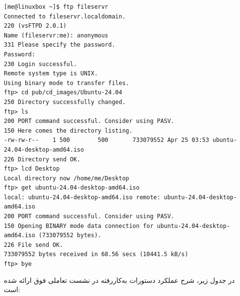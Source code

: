 \begin{latin}
\begin{lstlisting}
[me@linuxbox ~]$ ftp fileservr
Connected to fileservr.localdomain.
220 (vsFTPD 2.0.1)
Name (fileservr:me): anonymous
331 Please specify the password.
Password:
230 Login successful.
Remote system type is UNIX.
Using binary mode to transfer files.
ftp> cd pub/cd_images/Ubuntu-24.04
250 Directory successfully changed.
ftp> ls
200 PORT command successful. Consider using PASV.
150 Here comes the directory listing.
-rw-rw-r--    1 500        500       733079552 Apr 25 03:53 ubuntu-24.04-desktop-amd64.iso
226 Directory send OK.
ftp> lcd Desktop
Local directory now /home/me/Desktop
ftp> get ubuntu-24.04-desktop-amd64.iso
local: ubuntu-24.04-desktop-amd64.iso remote: ubuntu-24.04-desktop-amd64.iso
200 PORT command successful. Consider using PASV.
150 Opening BINARY mode data connection for ubuntu-24.04-desktop-amd64.iso (733079552 bytes).
226 File send OK.
733079552 bytes received in 68.56 secs (10441.5 kB/s)
ftp> bye
\end{lstlisting}
\end{latin}

در جدول زیر، شرح عملکرد دستورات به‌کاررفته در نشست تعاملی فوق ارائه شده است:

